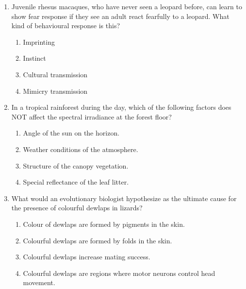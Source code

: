 \begin{enumerate}
\item Juvenile rhesus macaques, who have never seen a leopard before, can learn to show fear response if they see an adult react fearfully to a leopard. What kind of behavioural response is this?
\begin{multicols}{2}
\begin{enumerate}
\item Imprinting
\item Instinct
\item Cultural transmission
\item Mimicry transmission
\end{enumerate}
\end{multicols}

\item In a tropical rainforest during the day, which of the following factors does NOT affect the spectral irradiance at the forest floor?
\begin{multicols}{2}
\begin{enumerate}
\item Angle of the sun on the horizon.
\item Weather conditions of the atmosphere.
\item Structure of the canopy vegetation.
\item Special reflectance of the leaf litter.
\end{enumerate}
\end{multicols}

\item What would an evolutionary biologist hypothesize as the ultimate cause for the presence of colourful dewlaps in lizards?
\begin{multicols}{2}
\begin{enumerate}
\item Colour of dewlaps are formed by pigments in the skin.
\item Colourful dewlaps are formed by folds in the skin.
\item Colourful dewlaps increase mating success.
\item Colourful dewlaps are regions where motor neurons control head movement.
\end{enumerate}
\end{multicols}


\end{enumerate}
